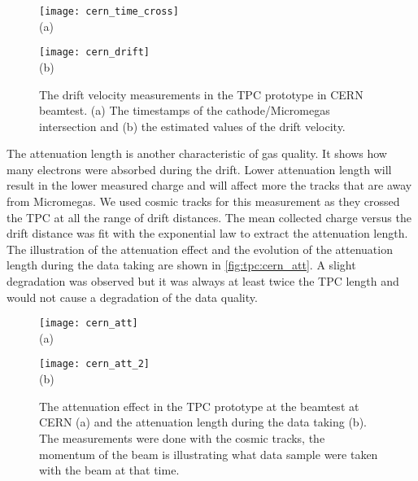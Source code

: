 \documentclass[../main.tex]{subfiles}
\begin{document}
\begin{figure}[!ht]
  \centering
  \begin{minipage}{0.49\linewidth}
    \centering
    \texttt{[image: cern\_time\_cross]} \\ (a)
  \end{minipage}
  \begin{minipage}{0.49\linewidth}
    \centering
    \texttt{[image: cern\_drift]} \\ (b)
  \end{minipage}
  \caption{The drift velocity measurements in the TPC prototype in CERN beamtest. (a) The timestamps of the cathode/Micromegas intersection and (b) the estimated values  of the drift velocity.}
  \label{fig:tpc:cern_drift}
\end{figure}

The attenuation length is another characteristic of gas quality. It shows how many electrons were absorbed during the drift. Lower attenuation length will result in the lower measured charge and will affect more the tracks that are away from Micromegas. We used cosmic tracks for this measurement as they crossed the TPC at all the range of drift distances. The mean collected charge versus the drift distance was fit with the exponential law to extract the attenuation length. The illustration of the attenuation effect and the evolution of the attenuation length during the data taking are shown in \autoref{fig:tpc:cern_att}. A slight degradation was observed but it was always at least twice the TPC length and would not cause a degradation of the data quality.

\begin{figure}[!ht]
  \centering
  \begin{minipage}{0.49\linewidth}
    \centering
    \texttt{[image: cern\_att]} \\ (a)
  \end{minipage}
  \begin{minipage}{0.49\linewidth}
    \centering
    \texttt{[image: cern\_att\_2]} \\ (b)
  \end{minipage}
  \caption{The attenuation effect in the TPC prototype at the beamtest at CERN (a) and the attenuation length during the data taking (b). The measurements were done with the cosmic tracks, the momentum of the beam is illustrating what data sample were taken with the beam at that time.}
  \label{fig:tpc:cern_att}
\end{figure}
\end{document}
